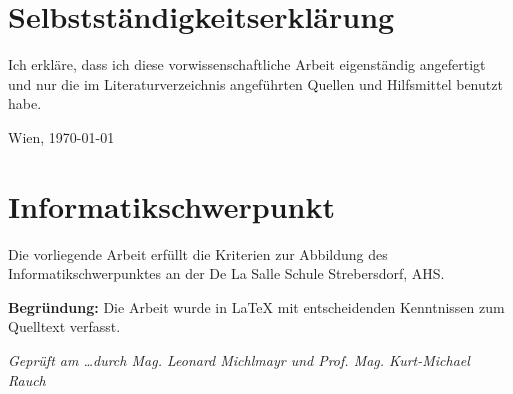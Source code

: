 \documentclass[DLS,
	inreferencehack,
	ohneVgl=true,
	ohneS=false,
	noscauthor,
	rundeauslassung=false,
	bookstyle=false,
	widowlines=3]{vwa}
\begin{document}
\frontmatter

\maketitle

% 

% 

\cleardoublepage{}
\tableofcontents

\mainmatter






\listoffigures
\begingroup
\let\clearpage\relax
\listoftables
\endgroup
\appendix


\backmatter

\section*{Selbstständigkeitserklärung}
\thispagestyle{plain}
Ich erkläre, dass ich diese vorwissenschaftliche Arbeit eigenständig
angefertigt und nur die im Literaturverzeichnis angeführten Quellen und
Hilfsmittel benutzt habe.

\vspace{2cm}\noindent Wien, \today

\vspace{2cm}\noindent\makeatletter\@AutorIn\makeatother

\vspace{2cm}\noindent

\section*{Informatikschwerpunkt}

Die vorliegende Arbeit erfüllt die Kriterien zur Abbildung des
Informatikschwerpunktes an der De La Salle Schule Strebersdorf, AHS.

\textbf{Begründung:} Die Arbeit wurde in \LaTeX{} mit entscheidenden
Kenntnissen zum Quelltext verfasst.\vspace{.5\baselineskip}

\noindent\textit{Geprüft am \ldots durch Mag. Leonard Michlmayr und Prof. Mag.
Kurt-Michael Rauch}
\end{document}

